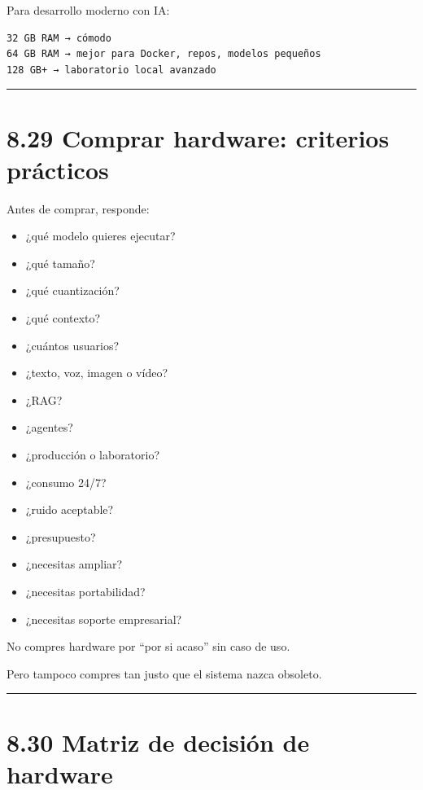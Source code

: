 Para desarrollo moderno con IA:

\begin{lstlisting}
32 GB RAM → cómodo
64 GB RAM → mejor para Docker, repos, modelos pequeños
128 GB+ → laboratorio local avanzado
\end{lstlisting}

\begin{center}\rule{0.5\linewidth}{0.5pt}\end{center}

\section{8.29 Comprar hardware: criterios
prácticos}\label{comprar-hardware-criterios-pruxe1cticos}

Antes de comprar, responde:

\begin{itemize}
\tightlist
\item
  ¿qué modelo quieres ejecutar?
\item
  ¿qué tamaño?
\item
  ¿qué cuantización?
\item
  ¿qué contexto?
\item
  ¿cuántos usuarios?
\item
  ¿texto, voz, imagen o vídeo?
\item
  ¿RAG?
\item
  ¿agentes?
\item
  ¿producción o laboratorio?
\item
  ¿consumo 24/7?
\item
  ¿ruido aceptable?
\item
  ¿presupuesto?
\item
  ¿necesitas ampliar?
\item
  ¿necesitas portabilidad?
\item
  ¿necesitas soporte empresarial?
\end{itemize}

No compres hardware por ``por si acaso'' sin caso de uso.

Pero tampoco compres tan justo que el sistema nazca obsoleto.

\begin{center}\rule{0.5\linewidth}{0.5pt}\end{center}

\section{8.30 Matriz de decisión de
hardware}\label{matriz-de-decisiuxf3n-de-hardware}


